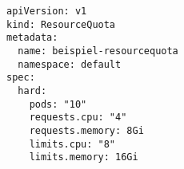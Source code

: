 \begin{verbatim}
apiVersion: v1
kind: ResourceQuota
metadata:
  name: beispiel-resourcequota
  namespace: default
spec:
  hard:
    pods: "10"
    requests.cpu: "4"
    requests.memory: 8Gi
    limits.cpu: "8"
    limits.memory: 16Gi
\end{verbatim}
